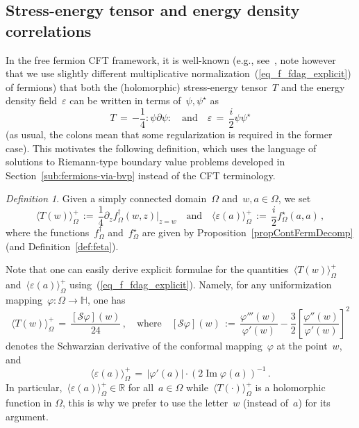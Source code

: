 \documentclass[reqno,11pt,a4paper]{amsart}
\theoremstyle{remark}
\newtheorem{definition}[proposition]{Definition}
\newcommand{\schw}{\mathcal{S}}
\newcommand{\R}{\mathbb{R}}
\renewcommand{\H}{\mathbb{H}}
\newcommand{\fstar}{f_{\Omega}^\star}
\newcommand{\freg}{f_{\Omega}^\dag}
\newcommand\opsi{\psi^\star}
\renewcommand\Im{\operatorname{Im}}
\newcommand\Corr[1]{\langle #1 \rangle}
\newcommand\CorrO[2][+]{\Corr{#2}_\Omega^{#1}}
\begin{document}
\subsection{Stress-energy tensor and energy density correlations} \label{sub:T-and-energy-via-fermions}

In the free fermion CFT framework, it is well-known (e.g., see~\cite[Sec. 12.3 and 14.2.1]{Mus10}, note however that we use slightly different multiplicative normalization~(\ref{eq_f_fdag_explicit}) of fermions) that both the (holomorphic) stress-energy tensor~$T$ and the energy density field~$\varepsilon$ can be written in terms of~$\psi,\opsi$ as
\[
T\,=\,{-\textstyle\frac{1}{4}}:\!\psi\partial\psi\!:\quad\text{and}\quad \varepsilon\,=\,{\textstyle\frac{i}{2}}\psi\opsi
\]
(as usual, the colons mean that some regularization is required in the former case). This motivates the following definition, which uses the language of solutions to Riemann-type boundary value problems developed in Section~\ref{sub:fermions-via-bvp} instead of the CFT terminology.

\begin{definition} \label{def:T-and-eps-one-point}
Given a simply connected domain~$\Omega$ and~$w,a\in\Omega$, we set %
\[
\CorrO{T(w)}\,:=\,{\textstyle\frac{1}{4}}\partial_z \freg(w,z)\big|_{z=w}\quad\text{and}\quad \CorrO{\varepsilon(a)}\,:=\, {\textstyle\frac{i}{2}}\fstar(a,a)\,,
\]
where the functions~$\freg$ and~$\fstar$ are given by Proposition~\ref{propContFermDecomp} (and Definition~\ref{def:feta}).
\end{definition}

Note that one can easily derive explicit formulae for the quantities~$\CorrO{T(w)}$ and~$\CorrO{\varepsilon(a)}$ using~(\ref{eq_f_fdag_explicit}). Namely, for any uniformization mapping~$\varphi:\Omega\to \H$, one has
\begin{equation}
\label{eq_T_explicit}
\CorrO{T(w)}\,=\,\frac{[\schw\varphi](w)}{24}\,,\quad \text{where}\quad [\schw\varphi](w)\,:=\,\frac{\varphi'''(w)}{\varphi'(w)}-\frac{3}{2}\left[\frac{\varphi''(w)}{\varphi'(w)}\right]^2
\end{equation}
denotes the Schwarzian derivative of the conformal mapping~$\varphi$ at the point~$w$, and
\begin{equation}
\label{eq_e_explicit}
\CorrO{\varepsilon(a)}\,=\,|\varphi'(a)|\cdot (2\Im\varphi(a))^{-1}\,.
\end{equation}
In particular,~$\CorrO{\varepsilon(a)}\in\R$ for all~$a\in\Omega$ while~$\CorrO{T(\cdot)}$ is a holomorphic function in $\Omega$, this is why we prefer to use the letter~$w$ (instead of~$a$) for its argument.
\end{document}
